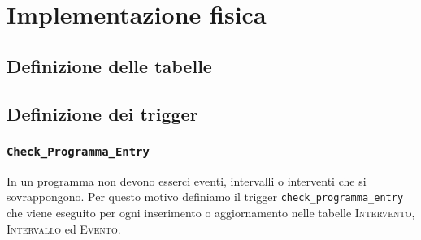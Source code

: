 \chapter{Implementazione fisica}
\section{Definizione delle tabelle}

\section{Definizione dei trigger}
\subsection{\texttt{Check\_Programma\_Entry}}
In un programma non devono esserci eventi, intervalli o interventi che si sovrappongono. Per questo motivo definiamo il trigger \texttt{check\_programma\_entry} che viene eseguito per ogni inserimento o aggiornamento nelle tabelle \textsc{Intervento}, \textsc{Intervallo} ed \textsc{Evento}.
